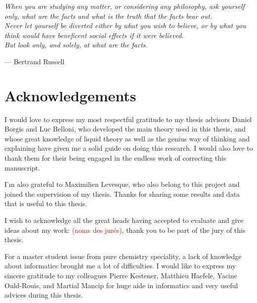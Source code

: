 
\begin{flushright}
\textsl{When you are studying any matter, or considering any philosophy,
ask yourself only, what are the facts and what is the truth that the
facts bear out.}\\
\textsl{ Never let yourself be diverted either by what you wish to
believe, or by what you think would have beneficent social effects
if it were believed.}\\
\textsl{ But look only, and solely, at what are the facts.}
\par\end{flushright}

\begin{flushright}
--- Bertrand Russell 
\par\end{flushright}

\bigskip{}


\begingroup
\let\clearpage\relax
\let\cleardoublepage\relax 


\chapter*{Acknowledgements}

I would love to express my most respectful gratitude to my thesis
advisors Daniel Borgis and Luc Belloni, who developed the main theory
used in this thesis, and whose great knowledge of liquid theory as
well as the genius way of thinking and explaining have given me a
solid guide on doing this research. I would also love to thank them
for their being engaged in the endless work of correcting this manuscript.

I'm also grateful to Maximilien Levesque, who also belong to this
project and joined the supervision of my thesis. Thanks for sharing
some results and data that is useful to this thesis.

I wish to acknowledge all the great heads having accepted to evaluate
and give ideas about my work: \textcolor{red}{(noms des jurés)}, thank
you to be part of the jury of this thesis.

For a master student issue from pure chemistry speciality, a lack
of knowledge about informatics brought me a lot of difficulties. I
would like to express my sincere gratitude to my colleagues Pierre
Kestener, Matthieu Haefele, Yacine Ould-Rouis, and Martial Mancip
for huge aide in informatics and very useful advices during this thesis.

